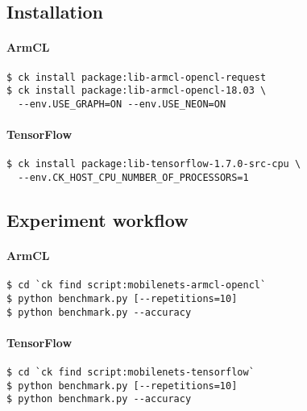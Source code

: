 \subsection{Installation}

\paragraph{ArmCL}

\begin{verbatim}
$ ck install package:lib-armcl-opencl-request
$ ck install package:lib-armcl-opencl-18.03 \
  --env.USE_GRAPH=ON --env.USE_NEON=ON
\end{verbatim}

\paragraph{TensorFlow}

\begin{verbatim}
$ ck install package:lib-tensorflow-1.7.0-src-cpu \
  --env.CK_HOST_CPU_NUMBER_OF_PROCESSORS=1
\end{verbatim}


\subsection{Experiment workflow}

\paragraph{ArmCL}

\begin{verbatim}
$ cd `ck find script:mobilenets-armcl-opencl`
$ python benchmark.py [--repetitions=10]
$ python benchmark.py --accuracy
\end{verbatim}

\paragraph{TensorFlow}

\begin{verbatim}
$ cd `ck find script:mobilenets-tensorflow`
$ python benchmark.py [--repetitions=10]
$ python benchmark.py --accuracy
\end{verbatim}


